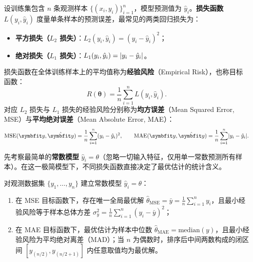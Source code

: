 \begin{definition}[损失函数与经验风险]\label{def:loss-empirical-risk}
设训练集包含 $n$ 条观测样本 $\{(x_i, y_i)\}_{i=1}^{n}$，模型预测值为 $\hat{y}_i$。\textbf{损失函数} $L(y_i, \hat{y}_i)$ 度量单条样本的预测误差，最常见的两类回归损失为：
\begin{itemize}
  \item \textbf{平方损失（$L_2$ 损失）}：$L_2(y_i, \hat{y}_i) = (y_i - \hat{y}_i)^2$；
  \item \textbf{绝对损失（$L_1$ 损失）}：$L_1(y_i, \hat{y}_i) = \lvert y_i - \hat{y}_i\rvert$。
\end{itemize}
损失函数在全体训练样本上的平均值称为\textbf{经验风险}（Empirical Risk），也称目标函数：
\begin{equation}\label{eq:empirical-risk}
  R(\bm{\theta}) = \frac{1}{n}\sum_{i=1}^{n} L(y_i, \hat{y}_i).
\end{equation}
对应 $L_2$ 损失与 $L_1$ 损失的经验风险分别称为\textbf{均方误差}（Mean Squared Error, MSE）与\textbf{平均绝对误差}（Mean Absolute Error, MAE）：
\[
  \mathrm{MSE}(\bm{y}, \hat{\bm{y}}) = \frac{1}{n}\sum_{i=1}^{n}(y_i - \hat{y}_i)^2,\qquad
  \mathrm{MAE}(\bm{y}, \hat{\bm{y}}) = \frac{1}{n}\sum_{i=1}^{n}\abs{y_i - \hat{y}_i}.
\]
\end{definition}

先考察最简单的\textbf{常数模型} $\hat{y}_i = \theta$（忽略一切输入特征，仅用单一常数预测所有样本）。在这一极简模型下，不同损失函数直接决定了最优估计的统计含义。

\begin{theorem}\label{thm:constant-mse-mae}
对观测数据集 $\{y_1, \dots, y_n\}$ 建立常数模型 $\hat{y}_i = \theta$：
\begin{enumerate}
  \item 在 MSE 目标函数下，存在唯一全局最优解 $\hat{\theta}_{\mathrm{MSE}} = \bar{y} = \frac{1}{n}\sum_{i=1}^{n}y_i$，且最小经验风险等于样本总体方差 $\sigma_y^2 = \frac{1}{n}\sum_{i=1}^{n}(y_i-\bar{y})^2$；
  \item 在 MAE 目标函数下，最优估计为样本中位数 $\hat{\theta}_{\mathrm{MAE}} = \mathrm{median}(y)$，且最小经验风险为平均绝对离差（MAD）；当 $n$ 为偶数时，排序后中间两数构成的闭区间 $[y_{(n/2)}, y_{(n/2+1)}]$ 内任意取值均为最优解。
\end{enumerate}
\end{theorem}

